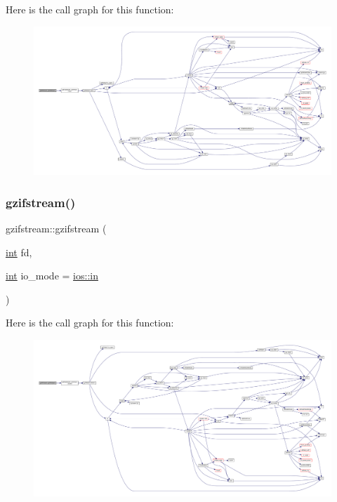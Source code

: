 Here is the call graph for this function\+:
\nopagebreak
\begin{figure}[H]
\begin{center}
\leavevmode
\includegraphics[width=350pt]{classgzifstream_a56e464903ee517fb3377f9d8a2977694_cgraph}
\end{center}
\end{figure}
\mbox{\label{classgzifstream_ab1380a28c963c7b3b85dc63d0d11cc1a}} 
\subsubsection{\texorpdfstring{gzifstream()}{gzifstream()}\hspace{0.1cm}{\footnotesize\ttfamily [3/6]}}
{\footnotesize\ttfamily gzifstream\+::gzifstream (\begin{DoxyParamCaption}\item[{\mbox{\hyperlink{ioapi_8h_a787fa3cf048117ba7123753c1e74fcd6}{int}}}]{fd,  }\item[{\mbox{\hyperlink{ioapi_8h_a787fa3cf048117ba7123753c1e74fcd6}{int}}}]{io\+\_\+mode = {\ttfamily \mbox{\hyperlink{gun_8c_a8bab68b4d22f69428207fabb60dc4f5c}{ios\+::in}}} }\end{DoxyParamCaption})}

Here is the call graph for this function\+:
\nopagebreak
\begin{figure}[H]
\begin{center}
\leavevmode
\includegraphics[width=350pt]{classgzifstream_ab1380a28c963c7b3b85dc63d0d11cc1a_cgraph}
\end{center}
\end{figure}
\mbox{\label{classgzifstream_a61a1c9344f4d50c2ae7b3e555a509385}} 
